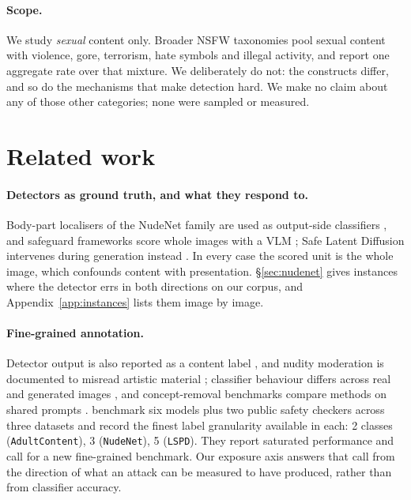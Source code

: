 \documentclass[11pt]{article}
\begin{document}
\paragraph{Scope.}
We study \emph{sexual} content only. Broader NSFW taxonomies pool sexual content
with violence, gore, terrorism, hate symbols and illegal activity, and report
one aggregate rate over that mixture. We deliberately do not: the constructs
differ, and so do the mechanisms that make detection hard. We make no claim
about any of those other categories; none were sampled or measured.

\section{Related work}
\label{sec:related}

\paragraph{Detectors as ground truth, and what they respond to.} Body-part
localisers of the NudeNet family are used as output-side classifiers
\citep[Table~1]{crack}, and safeguard frameworks score whole images with a VLM
\citep{llavaguard,shieldgemma2}; Safe Latent Diffusion intervenes during
generation instead \citep{sld}. In every case the scored unit is the whole
image, which confounds content with presentation. \S\ref{sec:nudenet} gives
instances where the detector errs in both directions on our corpus, and
Appendix~\ref{app:instances} lists them image by image.

\paragraph{Fine-grained annotation.} Detector output is also reported as a
content label \citep{nudenet,safesearch}, and nudity moderation is documented to
misread artistic material \citep{artcentric}; classifier behaviour differs across
real and generated images \citep{unsafebench}, and concept-removal benchmarks
compare methods on shared prompts \citep{sixcd}. \citet{nuditysota} benchmark six
models plus two public safety checkers across three datasets and record the
finest label granularity available in each: 2 classes (\texttt{AdultContent}), 3
(\texttt{NudeNet}), 5 (\texttt{LSPD}). They report saturated performance and call
for a new fine-grained benchmark. Our exposure axis answers that call from the
direction of what an attack can be measured to have produced, rather than from
classifier accuracy.
\end{document}
